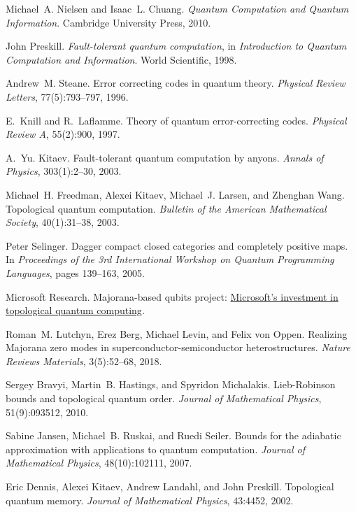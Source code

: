 \documentclass[11pt]{article}
\begin{document}

\begin{thebibliography}{10}

Michael~A. Nielsen and Isaac~L. Chuang.
\newblock \textit{Quantum Computation and Quantum Information}.
\newblock Cambridge University Press, 2010.

John Preskill.
\newblock \textit{Fault-tolerant quantum computation}, in 
\newblock \textit{Introduction to Quantum Computation and Information}.
\newblock World Scientific, 1998.

Andrew~M. Steane.
\newblock Error correcting codes in quantum theory.
\newblock \emph{Physical Review Letters}, 77(5):793--797, 1996.

E.~Knill and R.~Laflamme.
\newblock Theory of quantum error-correcting codes.
\newblock \emph{Physical Review A}, 55(2):900, 1997.

A.~Yu. Kitaev.
\newblock Fault-tolerant quantum computation by anyons.
\newblock \emph{Annals of Physics}, 303(1):2--30, 2003.

Michael~H. Freedman, Alexei Kitaev, Michael~J. Larsen, and Zhenghan Wang.
\newblock Topological quantum computation.
\newblock \emph{Bulletin of the American Mathematical Society}, 40(1):31--38, 2003.

Peter Selinger.
\newblock Dagger compact closed categories and completely positive maps.
\newblock In \emph{Proceedings of the 3rd International Workshop on Quantum Programming Languages}, pages 139--163, 2005.

Microsoft Research.
\newblock Majorana-based qubits project: \href{https://cloudblogs.microsoft.com/quantum/2022/06/14/microsofts-investment-in-topological-quantum-computing/}{Microsoft's investment in topological quantum computing}.

Roman~M. Lutchyn, Erez Berg, Michael Levin, and Felix von Oppen.
\newblock Realizing Majorana zero modes in superconductor-semiconductor heterostructures.
\newblock \emph{Nature Reviews Materials}, 3(5):52--68, 2018.

Sergey Bravyi, Martin~B. Hastings, and Spyridon Michalakis.
\newblock Lieb-Robinson bounds and topological quantum order.
\newblock \emph{Journal of Mathematical Physics}, 51(9):093512, 2010.

Sabine Jansen, Michael~B. Ruskai, and Ruedi Seiler.
\newblock Bounds for the adiabatic approximation with applications to quantum computation.
\newblock \emph{Journal of Mathematical Physics}, 48(10):102111, 2007.

Eric Dennis, Alexei Kitaev, Andrew Landahl, and John Preskill.
\newblock Topological quantum memory.
\newblock \emph{Journal of Mathematical Physics}, 43:4452, 2002.

\end{thebibliography}
\end{document}

